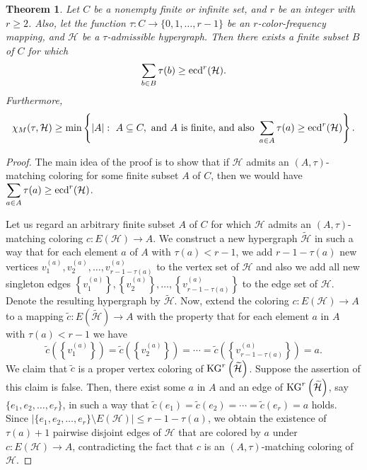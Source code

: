 \documentclass[11pt]{amsart}
\newtheorem{theorem}{Theorem} %
\theoremstyle{definition}
\begin{document}
\begin{theorem} \label{mainthmSaeed2}
	Let $C$ be a nonempty finite or infinite set, and $r$ be an integer with $r\geq 2$.
	Also, let the function $\tau: C \longrightarrow \{0,1,\ldots,r-1\}$ be an $r$-color-frequency mapping, and ${\mathcal H}$ be a $\tau$-admissible hypergraph. Then
	there exists a finite subset
	$B$ of $C$ for which
	$$\sum_{b\in B}\tau(b) \geq  {\rm ecd}^r({\mathcal H}) .$$
	Furthermore,
	$$\chi_M(\tau,{\mathcal H})\geq \min\left\{|A|:\   A \subseteq C, \mbox{ and } A \mbox{ is finite,}  \mbox{ and also } \sum_{a\in A}\tau(a) \geq  {\rm ecd}^r({\mathcal H})\right\}.$$
\end{theorem}

\begin{proof}{
		The main idea of the proof is to show that if ${\mathcal H}$ admits an $(A,\tau)$-matching coloring for some finite subset $A$ of $C$, then we would have $\displaystyle\sum_{a\in A}\tau(a) \geq  {\rm ecd}^r({\mathcal H})$.
		
		Let us regard an arbitrary finite subset $A$ of $C$ for which ${\mathcal H}$ admits an $(A,\tau)$-matching coloring $c: E({\mathcal H})\longrightarrow A$. We construct a new hypergraph $\widetilde{{\mathcal H}}$ in such a way that for each element $a$ of $A$ with $\tau(a) < r-1$, we add $r-1-\tau(a)$ new vertices
		$v^{(a)}_{1},v^{(a)}_{2},\ldots ,v^{(a)}_{r-1-\tau(a)}$ to the vertex set of ${\mathcal H}$ and also we add all new singleton edges $\left\{v^{(a)}_{1}\right\},\left\{v^{(a)}_{2}\right\},\ldots ,\left\{v^{(a)}_{r-1-\tau(a)}\right\}$ to the edge set of ${\mathcal H}$. Denote the resulting hypergraph by $\widetilde{{\mathcal H}}$. Now, extend the coloring $c: E({\mathcal H})\longrightarrow A$ to a mapping $\widetilde{c}: E \left(\widetilde{{\mathcal H}}\right)\longrightarrow A$ with the property that for each element $a$ in $A$ with $\tau(a) < r-1$ we have
		$$\widetilde{c}\left(\left\{v^{(a)}_{1}\right\}\right)=\widetilde{c}\left(\left\{v^{(a)}_{2}\right\}\right)=\cdots =\widetilde{c}\left(\left\{v^{(a)}_{r-1-\tau(a)}\right\}\right)=a.$$
		We claim that $\widetilde{c}$ is a proper vertex coloring of ${\rm KG}^r\left(\widetilde{{\mathcal H}}\right)$.
		Suppose the assertion of this claim is false. Then, there exist some $a$ in $A$ and an edge of ${\rm KG}^r\left(\widetilde{{\mathcal H}}\right)$, say
		$\{e_{1},e_{2},\ldots , e_{r}\}$, in such a way that $\widetilde{c}(e_{1})=\widetilde{c}(e_{2})=\cdots = \widetilde{c}(e_{r}) =a$ holds.
		Since $|\{e_{1},e_{2},\ldots , e_{r}\}\setminus E(\mathcal{H})|\leq r-1-\tau (a)$,
		we obtain the existence of $\tau (a) +1$ pairwise disjoint edges of $\mathcal{H}$ that are colored by $a$ under $c: E({\mathcal H})\longrightarrow A$, contradicting the fact that $c$ is an $(A,\tau)$-matching coloring of $\mathcal{H}$.
		
}
\end{proof}
\end{document}

